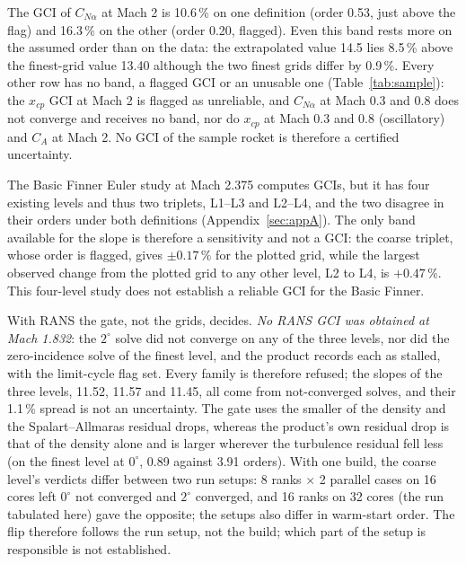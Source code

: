\documentclass[twocolumn]{labreport}
\newcommand{\CNa}{C_{N\alpha}}
\begin{document}
The GCI of $\CNa$ at Mach 2 is 10.6\,\% on one definition (order 0.53, just above the flag) and 16.3\,\% on the other (order 0.20, flagged).
Even this band rests more on the assumed order than on the data: the extrapolated value 14.5 lies 8.5\,\% above the finest-grid value 13.40 although the two finest grids differ by 0.9\,\%.
Every other row has no band, a flagged GCI or an unusable one (Table~\ref{tab:sample}): the $x_{cp}$ GCI at Mach 2 is flagged as unreliable, and $\CNa$ at Mach 0.3 and 0.8 does not converge and receives no band, nor do $x_{cp}$ at Mach 0.3 and 0.8 (oscillatory) and $C_A$ at Mach 2.
No GCI of the sample rocket is therefore a certified uncertainty.

The Basic Finner Euler study at Mach 2.375 computes GCIs, but it has four existing levels and thus two triplets, L1--L3 and L2--L4, and the two disagree in their orders under both definitions (Appendix~\ref{sec:appA}).
The only band available for the slope is therefore a sensitivity and not a GCI: the coarse triplet, whose order is flagged, gives $\pm0.17\,\%$ for the plotted grid, while the largest observed change from the plotted grid to any other level, L2 to L4, is $+0.47\,\%$.
This four-level study does not establish a reliable GCI for the Basic Finner.

With RANS the gate, not the grids, decides.
\emph{No RANS GCI was obtained at Mach 1.832}: the $2^\circ$ solve did not converge on any of the three levels, nor did the zero-incidence solve of the finest level, and the product records each as stalled, with the limit-cycle flag set.
Every family is therefore refused; the slopes of the three levels, 11.52, 11.57 and 11.45, all come from not-converged solves, and their 1.1\,\% spread is not an uncertainty.
The gate uses the smaller of the density and the Spalart--Allmaras residual drops, whereas the product's own residual drop is that of the density alone and is larger wherever the turbulence residual fell less (on the finest level at $0^\circ$, 0.89 against 3.91 orders).
With one build, the coarse level's verdicts differ between two run setups: 8 ranks $\times$ 2 parallel cases on 16 cores left $0^\circ$ not converged and $2^\circ$ converged, and 16 ranks on 32 cores (the run tabulated here) gave the opposite; the setups also differ in warm-start order. The flip therefore follows the run setup, not the build; which part of the setup is responsible is not established.
\end{document}
